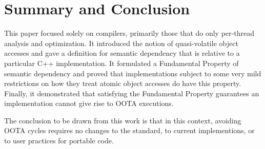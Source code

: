 \section{Summary and Conclusion}
\label{sec:Summary and Conclusion}

This paper focused solely on compilers, primarily those that do only
per-thread analysis and optimization.
It introduced the notion of quasi-volatile object accesses and gave
a definition for semantic dependency that is relative to a particular
C++ implementation.
It formulated a Fundamental Property of semantic dependency and proved
that implementations subject to some very mild restrictions on how
they treat atomic object accesses do have this property.
Finally, it demonstrated that satisfying the Fundamental Property
guarantees an implementation cannot give rise to OOTA executions.

The conclusion to be drawn from this work is that in this context,
avoiding OOTA cycles requires no changes to the standard,
to current implementions, or to user practices for portable code.











